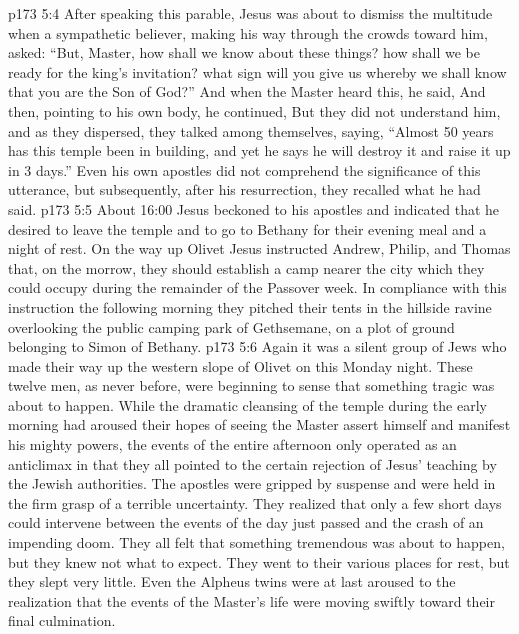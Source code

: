 \vs p173 5:4 \pc After speaking this parable, Jesus was about to dismiss the multitude when a sympathetic believer, making his way through the crowds toward him, asked: “But, Master, how shall we know about these things? how shall we be ready for the king’s invitation? what sign will you give us whereby we shall know that you are the Son of God?” And when the Master heard this, he said,  And then, pointing to his own body, he continued,  But they did not understand him, and as they dispersed, they talked among themselves, saying, “Almost 50 years has this temple been in building, and yet he says he will destroy it and raise it up in 3 days.” Even his own apostles did not comprehend the significance of this utterance, but subsequently, after his resurrection, they recalled what he had said.
\vs p173 5:5 About 16:00 Jesus beckoned to his apostles and indicated that he desired to leave the temple and to go to Bethany for their evening meal and a night of rest. On the way up Olivet Jesus instructed Andrew, Philip, and Thomas that, on the morrow, they should establish a camp nearer the city which they could occupy during the remainder of the Passover week. In compliance with this instruction the following morning they pitched their tents in the hillside ravine overlooking the public camping park of Gethsemane, on a plot of ground belonging to Simon of Bethany.
\vs p173 5:6 Again it was a silent group of Jews who made their way up the western slope of Olivet on this Monday night. These twelve men, as never before, were beginning to sense that something tragic was about to happen. While the dramatic cleansing of the temple during the early morning had aroused their hopes of seeing the Master assert himself and manifest his mighty powers, the events of the entire afternoon only operated as an anticlimax in that they all pointed to the certain rejection of Jesus’ teaching by the Jewish authorities. The apostles were gripped by suspense and were held in the firm grasp of a terrible uncertainty. They realized that only a few short days could intervene between the events of the day just passed and the crash of an impending doom. They all felt that something tremendous was about to happen, but they knew not what to expect. They went to their various places for rest, but they slept very little. Even the Alpheus twins were at last aroused to the realization that the events of the Master’s life were moving swiftly toward their final culmination.
\quizlink
